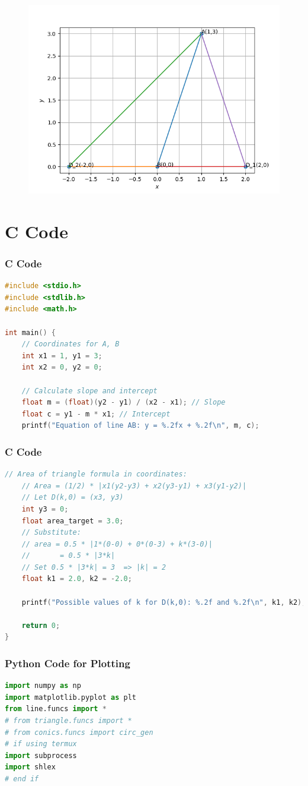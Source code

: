 \documentclass{beamer}
\theoremstyle{remark}
\numberwithin{equation}{section}
\begin{document}
       \begin{frame}[fragile]
    \begin{figure}[H]
    \centering
    \includegraphics[width = 0.6\columnwidth]{../figs/img.png}
    \caption*{}
    \label{figs}
\end{figure}
\end{frame}
\section{ C Code}
\begin{frame}[fragile]
\frametitle{C Code }
\begin{lstlisting}[language=C]
#include <stdio.h>
#include <stdlib.h>
#include <math.h>

int main() {
    // Coordinates for A, B
    int x1 = 1, y1 = 3;
    int x2 = 0, y2 = 0;

    // Calculate slope and intercept
    float m = (float)(y2 - y1) / (x2 - x1); // Slope
    float c = y1 - m * x1; // Intercept
    printf("Equation of line AB: y = %.2fx + %.2f\n", m, c);
\end{lstlisting}
\end{frame}

\begin{frame}[fragile]
\frametitle{C Code }
\begin{lstlisting}[language=C]
        // Area of triangle formula in coordinates:
    // Area = (1/2) * |x1(y2-y3) + x2(y3-y1) + x3(y1-y2)|
    // Let D(k,0) = (x3, y3)
    int y3 = 0;
    float area_target = 3.0;
    // Substitute:
    // area = 0.5 * |1*(0-0) + 0*(0-3) + k*(3-0)|
    //       = 0.5 * |3*k|
    // Set 0.5 * |3*k| = 3  => |k| = 2
    float k1 = 2.0, k2 = -2.0;

    printf("Possible values of k for D(k,0): %.2f and %.2f\n", k1, k2);

    return 0;
}
\end{lstlisting}
\end{frame}
\begin{frame}[fragile]
\frametitle{Python Code for Plotting}
\begin{lstlisting}[language=Python]
import numpy as np
import matplotlib.pyplot as plt
from line.funcs import *
# from triangle.funcs import *
# from conics.funcs import circ_gen
# if using termux
import subprocess
import shlex
# end if

\end{lstlisting}

\end{frame}
\end{document}
